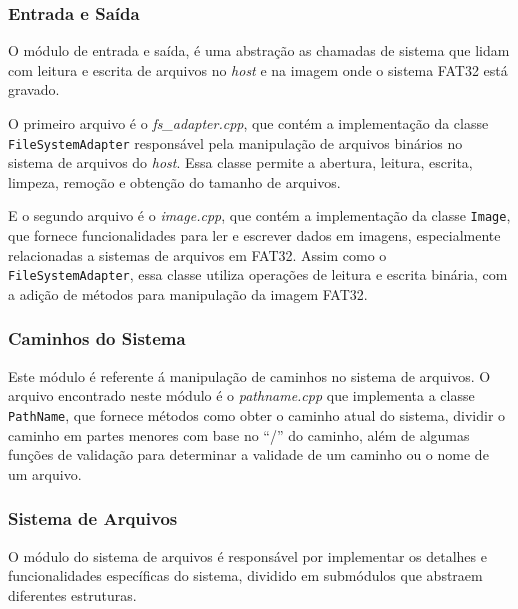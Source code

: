 \documentclass[
    12pt,				%
    oneside,   	        %
    a4paper,			%
    english,			%
    french,				%
    spanish,			%
    brazil,				%
    ]{pacotes/abntex2}
\begin{document}
\subsubsection{Entrada e Saída}
\label{subsubsec:io}

O módulo de entrada e saída, é uma abstração as chamadas de sistema que lidam com leitura e escrita de arquivos no \textit{host} e na imagem onde o sistema FAT32 está gravado.

O primeiro arquivo é o \textit{fs\_adapter.cpp}, que contém a implementação da classe \texttt{FileSystemAdapter} responsável pela manipulação de arquivos binários no sistema de arquivos do \textit{host}. Essa classe permite a abertura, leitura, escrita, limpeza, remoção e obtenção do tamanho de arquivos.

E o segundo arquivo é o \textit{image.cpp}, que contém a implementação da classe \texttt{Image}, que fornece funcionalidades para ler e escrever dados em imagens, especialmente relacionadas a sistemas de arquivos em FAT32. Assim como o \texttt{FileSystemAdapter}, essa classe utiliza operações de leitura e escrita binária, com a adição de métodos para manipulação da imagem FAT32.

\subsubsection{Caminhos do Sistema}
\label{subsubsec:parser}

Este módulo é referente á manipulação de caminhos no sistema de arquivos. O arquivo encontrado neste módulo é o \textit{pathname.cpp} que implementa a classe \texttt{PathName}, que fornece métodos como obter o caminho atual do sistema, dividir o caminho em partes menores com base no ``/'' do caminho, além de algumas funções de validação para determinar a validade de um caminho ou o nome de um arquivo.  

\subsubsection{Sistema de Arquivos}
\label{subsubsec:fs}

O módulo do sistema de arquivos é responsável por implementar os detalhes e funcionalidades específicas do sistema, dividido em submódulos que abstraem diferentes estruturas. 
\end{document}
